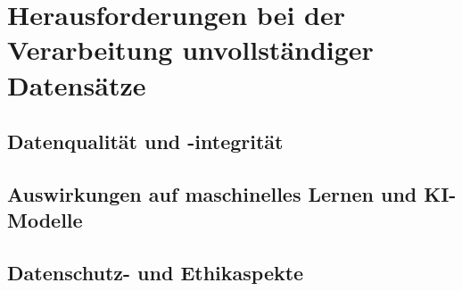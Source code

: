 \section{Herausforderungen bei der Verarbeitung unvollständiger Datensätze}\label{sec:challenges}

\subsection{Datenqualität und -integrität}\label{sec:challenges-data-integrity}

\subsection{Auswirkungen auf maschinelles Lernen und KI-Modelle}\label{sec:challenges-impact-ai}

\subsection{Datenschutz- und Ethikaspekte}\label{sec:challenges-ethic}